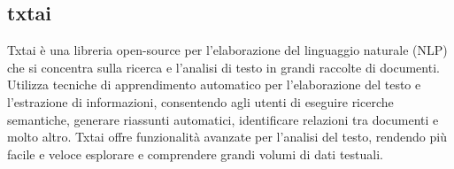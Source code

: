 \vspace{2em}
\subsection*{txtai}
Txtai è una libreria open-source per l'elaborazione del linguaggio naturale (NLP) che si concentra sulla ricerca e l'analisi di testo in grandi raccolte di documenti. Utilizza tecniche di apprendimento automatico per l'elaborazione del testo e l'estrazione di informazioni, consentendo agli utenti di eseguire ricerche semantiche, generare riassunti automatici, identificare relazioni tra documenti e molto altro. Txtai offre funzionalità avanzate per l'analisi del testo, rendendo più facile e veloce esplorare e comprendere grandi volumi di dati testuali.
